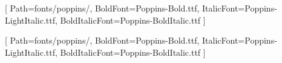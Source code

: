 \usepackage{fontspec}
\usepackage{titlesec}

\setmainfont{Poppins-Light.ttf}[
    Path=fonts/poppins/,
    BoldFont={Poppins-Bold.ttf},
    ItalicFont={Poppins-LightItalic.ttf},
    BoldItalicFont={Poppins-BoldItalic.ttf}
]

\setsansfont{Poppins-Light.ttf}[
    Path=fonts/poppins/,
    BoldFont={Poppins-Bold.ttf},
    ItalicFont={Poppins-LightItalic.ttf},
    BoldItalicFont={Poppins-BoldItalic.ttf}
]

\setlength{\parskip}{1em}

\setlength{\parindent}{0pt}

\renewcommand{\baselinestretch}{1.15}
